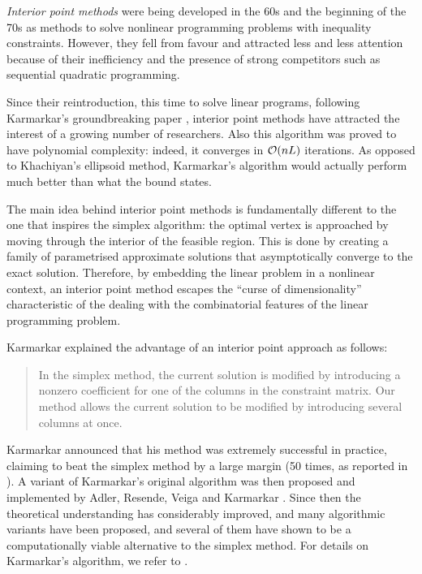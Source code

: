 {\em Interior point methods} were being developed in the 60s and the 
beginning of the 70s as methods to solve nonlinear programming problems 
with inequality constraints. 
However, they fell from favour and attracted less and less attention
because of their inefficiency and the presence of strong competitors
such as sequential quadratic programming.

Since their reintroduction, this time to solve linear programs, 
following Karmarkar's groundbreaking paper
\cite{Karmarkar}, interior point methods have attracted 
the interest of a growing number of researchers.
Also this algorithm was proved to have polynomial complexity: 
indeed, it converges in $\mathcal{O}(nL)$ iterations. As opposed to
Khachiyan's ellipsoid method, Karmarkar's algorithm would actually
perform much better than what the bound states.

The main idea behind interior point methods is fundamentally different 
to the one that inspires the simplex algorithm: the optimal vertex 
is approached by moving through the interior of the feasible region.
This is done by creating a family of parametrised approximate solutions
that asymptotically converge to the exact solution.
Therefore, by embedding the linear problem in a nonlinear context,
an interior point method escapes the ``curse of dimensionality''
characteristic of the dealing with the combinatorial features of the 
linear programming problem.

Karmarkar \cite{Karmarkar} explained the advantage of an
interior point approach as follows:
\begin{quotation}
In the simplex method, the current solution is modified by introducing
a nonzero coefficient for one of the columns in the constraint
matrix. Our method allows the current solution to be modified by
introducing several columns at once.
\end{quotation}


Karmarkar announced that his method was extremely successful in practice, 
claiming to beat the simplex method by a large margin (50 times,
as reported in \cite{MWright92}).
A variant of Karmarkar's original algorithm was then proposed and 
implemented by Adler, Resende, Veiga and Karmarkar 
\cite{AdlerResendeVeigaKarmarkar89}.
Since then the theoretical understanding has considerably improved,
and many algorithmic variants have been proposed, and several of
them have shown to be a computationally viable alternative to the
simplex method.
For details on Karmarkar's algorithm, we refer to
\cite[ch.6]{FangPuthenpura93}.


